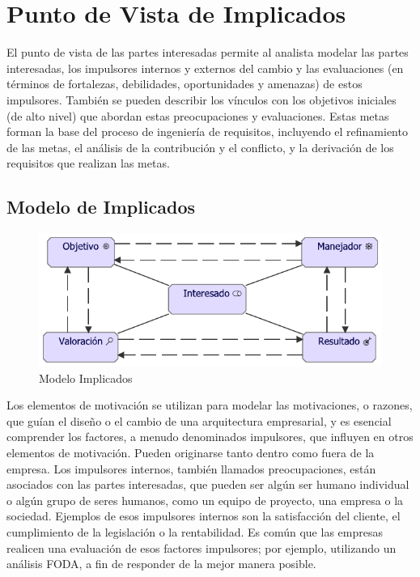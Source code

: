 \section{Punto de Vista de Implicados}
El punto de vista de las partes interesadas permite al analista modelar las partes interesadas, los impulsores internos y externos del cambio y las evaluaciones (en términos de fortalezas, debilidades, oportunidades y amenazas) de estos impulsores. También se pueden describir los vínculos con los objetivos iniciales (de alto nivel) que abordan estas preocupaciones y evaluaciones. Estas metas forman la base del proceso de ingeniería de requisitos, incluyendo el refinamiento de las metas, el análisis de la contribución y el conflicto, y la derivación de los requisitos que realizan las metas.

\subsection{Modelo de Implicados}
\begin{figure}[h!]
	\centering
	\includegraphics[width=1.0\linewidth]{imgs/modelo/Interesado}
	\caption{Modelo Implicados}
\end{figure}

Los elementos de motivación se utilizan para modelar las motivaciones, o razones, que guían el diseño o el cambio de una arquitectura empresarial, y es esencial comprender los factores, a menudo denominados impulsores, que influyen en otros elementos de motivación.  Pueden originarse tanto dentro como fuera de la empresa.  Los impulsores internos, también llamados preocupaciones, están asociados con las partes interesadas, que pueden ser algún ser humano individual o algún grupo de seres humanos, como un equipo de proyecto, una empresa o la sociedad. Ejemplos de esos impulsores internos son la satisfacción del cliente, el cumplimiento de la legislación o la rentabilidad. Es común que las empresas realicen una evaluación de esos factores impulsores; por ejemplo, utilizando un análisis FODA, a fin de responder de la mejor manera posible.

